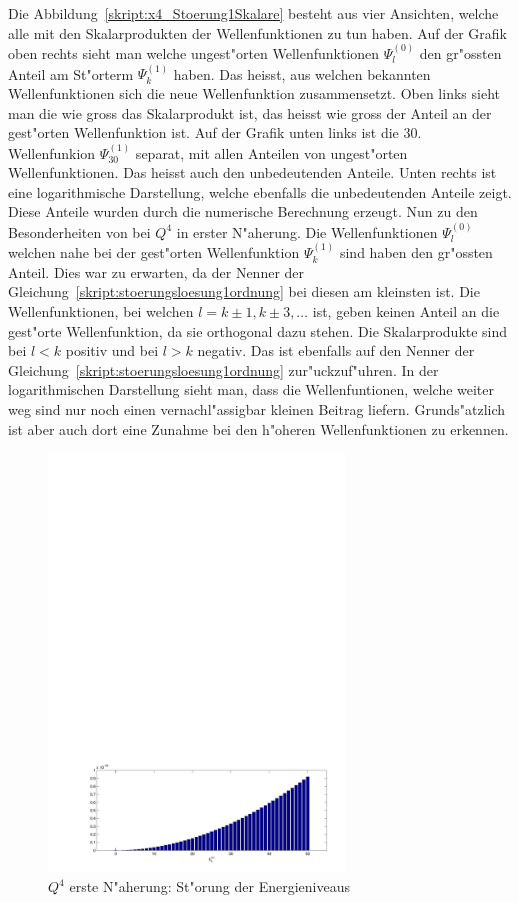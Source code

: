 \begin{refsection}
Die Abbildung~\ref{skript:x4_Stoerung1Skalare} besteht aus vier Ansichten,
welche alle mit den Skalarprodukten der Wellenfunktionen zu tun haben.
Auf der Grafik oben rechts sieht man welche ungest"orten
Wellenfunktionen $\Psi_l^{(0)}$ den gr"ossten Anteil am
St"orterm $\Psi_k^{(1)}$ haben.
Das heisst, aus welchen bekannten Wellenfunktionen sich die neue Wellenfunktion
zusammensetzt.
Oben links sieht man die wie gross das Skalarprodukt ist, das heisst wie gross der
Anteil an der gest"orten Wellenfunktion ist.
Auf der Grafik unten links ist die 30. Wellenfunkion $\Psi_{30}^{(1)}$ separat,
mit allen Anteilen von ungest"orten Wellenfunktionen.
Das heisst auch den unbedeutenden Anteile.
Unten rechts ist eine logarithmische Darstellung, welche ebenfalls die unbedeutenden
Anteile zeigt. Diese Anteile wurden durch die numerische Berechnung erzeugt.
Nun zu den Besonderheiten von bei $Q^4$ in erster N"aherung.
Die Wellenfunktionen $\Psi_l^{(0)}$ welchen nahe bei der gest"orten Wellenfunktion
$\Psi_k^{(1)}$ sind haben den gr"ossten Anteil.
Dies war zu erwarten, da der Nenner der
Gleichung~\ref{skript:stoerungsloesung1ordnung} bei diesen am kleinsten ist.
Die Wellenfunktionen, bei welchen $l=k\pm 1,k\pm 3,\dots$ ist,
geben keinen Anteil an die gest"orte Wellenfunktion, da sie orthogonal dazu stehen.
Die Skalarprodukte sind bei $l<k$ positiv und bei $l>k$ negativ.
Das ist ebenfalls auf den Nenner der Gleichung~\ref{skript:stoerungsloesung1ordnung}
zur"uckzuf"uhren.
In der logarithmischen Darstellung sieht man, dass die Wellenfuntionen,
welche weiter weg sind nur noch einen vernachl"assigbar kleinen Beitrag liefern.
Grunds"atzlich ist aber auch dort eine Zunahme bei den h"oheren Wellenfunktionen
zu erkennen.

\begin{figure}	%
\centering
\includegraphics[width=0.7\textwidth]{anharmonisch/images/x4/EK1.pdf}
\caption{$Q^4$ erste N"aherung: St"orung der Energieniveaus
\label{skript:x4_EK1}}
\end{figure}


\end{refsection}
